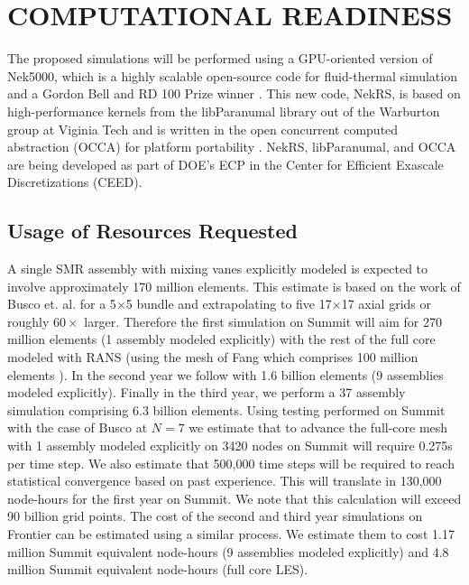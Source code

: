 \vspace{-.25in}
\section{COMPUTATIONAL READINESS} %
\vspace{-.2in}

The proposed simulations will be performed using a GPU-oriented version of
Nek5000, which is a highly scalable open-source code for fluid-thermal
simulation and a Gordon Bell and RD 100 Prize winner \cite{tufo99a}.  This new
code, NekRS, is based on high-performance kernels from the libParanumal library
out of the Warburton group at Viginia Tech
\cite{ChalmersKarakusAustinSwirydowiczWarburton2020,streamParanumal2020} and is
written in the open concurrent computed abstraction (OCCA) for platform
portability \cite{occa}.  NekRS, libParanumal, and OCCA are being developed as
part of DOE's ECP in the Center for Efficient Exascale Discretizations (CEED). 

\vspace{-.25in}
\subsection{Usage of Resources Requested }
\vspace{-.2in}

A single SMR assembly with mixing vanes explicitly modeled is expected to
involve approximately 170 million elements. This estimate is based on the work
of Busco et. al. \cite{busco2019invariant} for a 5$\times$5 bundle and extrapolating
to five 17$\times$17 axial grids or roughly $60 \times$ larger.
%
Therefore the first simulation on Summit will aim for 270 million elements (1
assembly modeled explicitly) with the rest of the full core modeled with RANS
(using the mesh of Fang which comprises 100  million elements \cite{Fang2021}).
In the second year we follow with 1.6 billion elements (9 assemblies modeled
explicitly).  Finally in the third year, we perform a 37 assembly simulation
comprising 6.3 billion elements.
%
Using testing performed on Summit with the case of Busco
\cite{fischer2021nekrs} at $N=7$ we estimate that to advance the full-core mesh
with 1 assembly modeled explicitly on 3420 nodes on Summit will require 0.275s
per time step. We also estimate that 500,000 time steps will be required to
reach statistical convergence based on past experience. This will translate in
130,000 node-hours for the first year on Summit. We note that this calculation
will exceed 90 billion grid points.
%
The cost of the second and third year simulations on Frontier can be estimated
using a similar process. We estimate them to cost 1.17 million Summit
equivalent node-hours (9 assemblies modeled explicitly) and 4.8 million Summit
equivalent node-hours (full core LES).

